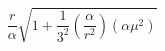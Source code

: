\begin{equation}
\frac{r}{\alpha} \sqrt{1 + \frac{1}{3^2} (\frac{\alpha}{r^2}) (\alpha
\mu^2)}  \nonumber
\end{equation}

